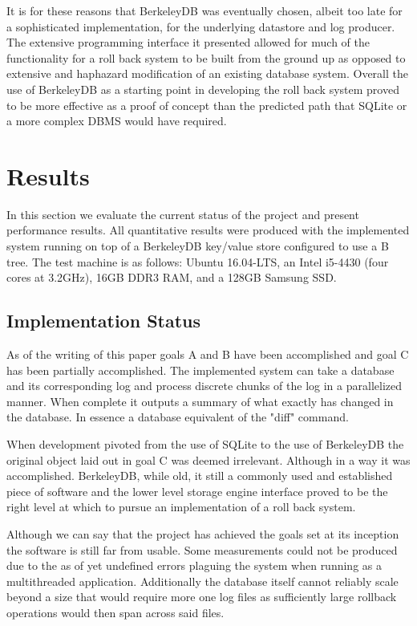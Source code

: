 \documentclass{article}
\begin{document}
It is for these reasons that BerkeleyDB was eventually chosen, albeit too late for a sophisticated implementation, for the underlying datastore and log producer. The extensive programming interface it presented allowed for much of the functionality for a roll back system to be built from the ground up as opposed to extensive and haphazard modification of an existing database system. Overall the use of BerkeleyDB as a starting point in developing the roll back system proved to be more effective as a proof of concept than the predicted path that SQLite or a more complex DBMS would have required. 

\section{Results}
In this section we evaluate the current status of the project and present performance results. All quantitative results were produced with the implemented system running on top of a BerkeleyDB key/value store configured to use a B tree. The test machine  is as follows: Ubuntu 16.04-LTS, an Intel i5-4430 (four cores at 3.2GHz), 16GB DDR3 RAM, and a 128GB Samsung SSD. 
\subsection{Implementation Status}

As of the writing of this paper goals A and B have been accomplished and goal C has been partially accomplished. The implemented system can take a database and its corresponding log and process discrete chunks of the log in a parallelized manner. When complete it outputs a summary of what exactly has changed in the database. In essence a database equivalent of the "diff" command. 

When development pivoted from the use of SQLite to the use of BerkeleyDB the original object laid out in goal C was deemed irrelevant. Although in a way it was accomplished. BerkeleyDB, while old, it still a commonly used and established piece of software and the lower level storage engine interface proved to be the right level at which to pursue an implementation of a roll back system.

Although we can say that the project has achieved the goals set at its inception the software is still far from usable. Some measurements could not be produced due to the as of yet undefined errors plaguing the system when running as a multithreaded application. Additionally the database itself cannot reliably scale beyond a size that would require more one log files as sufficiently large rollback operations would then span across said files.
\end{document}
